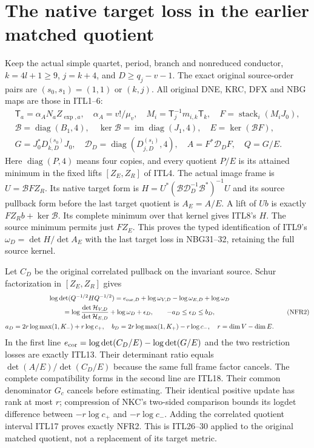 \documentclass[11pt,a4paper]{article}
\begin{document}
\section{The native target loss in the earlier matched quotient}
\label{sec:NFR}
Keep the actual simple quartet, period, branch and nonreduced conductor,
$k=4l+1\ge9$, $j=k+4$, and $D\ge q_j-v-1$. The exact original
source-order pairs are $(s_0,s_1)=(1,1)$ or $(k,j)$.
All original DNE, KRC, DFX and NBG maps are those in ITL1--6:
\[
\begin{gathered}
 \mathsf T_a=\alpha_A N_aZ_{\exp,a},\quad\alpha_A=v!/\mu_v,\quad
 M_i=\mathsf T_j^{-1}m_{i,k}\mathsf T_k,\quad
 F=\operatorname{stack}_i(M_iJ_0),\\
 \mathcal B=\operatorname{diag}(B_1,4),\quad
 \ker\mathcal B=\operatorname{im}\operatorname{diag}(J_1,4),
 \quad E=\ker(\mathcal BF),\\
 G=J_0^*D_{k,D}^{(s_0)}J_0,\quad
 \mathcal D_D=\operatorname{diag}(D_{j,D}^{(s_1)},4),\quad
 A=F^*\mathcal D_DF,\quad Q=G/E .
\end{gathered}\tag{NFR1}
\]
Here $\operatorname{diag}(P,4)$ means four copies, and every quotient
$P/E$ is its attained minimum in the fixed lifts $[Z_E,Z_R]$ of ITL4.
The actual image frame is $U=\mathcal BFZ_R$.
Its native target form is
$H=U^*(\mathcal B\mathcal D_D^{-1}\mathcal B^*)^{-1}U$ and its
source pullback form before the last target quotient is $A_E=A/E$.
A lift of $Ub$ is exactly $FZ_Rb+\ker\mathcal B$.
Its complete minimum over that kernel gives ITL8's $H$.
The source minimum permits just $FZ_E$. This proves the typed
identification of ITL9's $\omega_D=\det H/\det A_E$ with the
last target loss in NBG31--32, retaining the full source kernel.

Let $C_D$ be the original correlated pullback on the invariant source.
Schur factorization in $[Z_E,Z_R]$ gives
\[
\begin{gathered}
 \log\det(Q^{-1/2}HQ^{-1/2})
  =e_{{\rm cor},D}
      +\log\omega_{V,D}-\log\omega_{E,D}+\log\omega_D\\
  =\log\frac{\det\mathcal H_{V,D}}{\det\mathcal H_{E,D}}
                  +\log\omega_D+\epsilon_D,\qquad
 -a_D\le\epsilon_D\le b_D,\\
 a_D=2r\log\max(1,K_-)+r\log c_+,\quad
 b_D=2r\log\max(1,K_+)-r\log c_-,
 \quad r=\dim V-\dim E .
\end{gathered}\tag{NFR2}
\]
In the first line
$e_{\rm cor}=\log\det(C_D/E)-\log\det(G/E)$ and the two restriction
losses are exactly ITL13. Their determinant ratio equals
$\det(A/E)/\det(C_D/E)$ because the same full frame factor cancels.
The complete compatibility forms in the second line are ITL18.
Their common denominator $G_c$ cancels before estimating.
Their identical positive update has rank at most $r$; compression
of NKC's two-sided comparison bounds its logdet difference between
$-r\log c_+$ and $-r\log c_-$. Adding the correlated quotient
interval ITL17 proves exactly NFR2. This is ITL26--30 applied to
the original matched quotient, not a replacement of its target metric.
\end{document}
